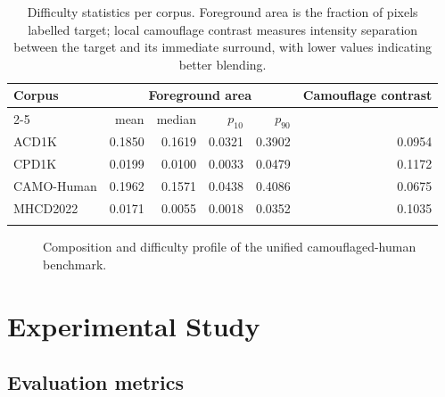 \documentclass[3p,times,procedia]{elsarticle}
\begin{document}
\begin{table}[h]
\caption{Difficulty statistics per corpus. Foreground area is the fraction of pixels labelled target; local camouflage contrast measures intensity separation between the target and its immediate surround, with lower values indicating better blending.}
\label{tab:difficulty}
\begin{tabular*}{\hsize}{@{\extracolsep{\fill}}lrrrrr@{}}
\toprule
\multirow{2}{*}{\textbf{Corpus}} & \multicolumn{4}{c}{\textbf{Foreground area}} & \multirow{2}{*}{\textbf{Camouflage contrast}} \\
\cline{2-5}
 & mean & median & $p_{10}$ & $p_{90}$ & \\
\colrule
ACD1K       & 0.1850 & 0.1619 & 0.0321 & 0.3902 & 0.0954 \\
CPD1K       & 0.0199 & 0.0100 & 0.0033 & 0.0479 & 0.1172 \\
CAMO-Human  & 0.1962 & 0.1571 & 0.0438 & 0.4086 & 0.0675 \\
MHCD2022    & 0.0171 & 0.0055 & 0.0018 & 0.0352 & 0.1035 \\
\botrule
\end{tabular*}
\end{table}

\begin{figure}[t]
\centering
\caption{Composition and difficulty profile of the unified camouflaged-human benchmark.}
\label{fig:dataset}
\end{figure}

\section{Experimental Study}
\label{sec:experiments}

\subsection{Evaluation metrics}
\end{document}

